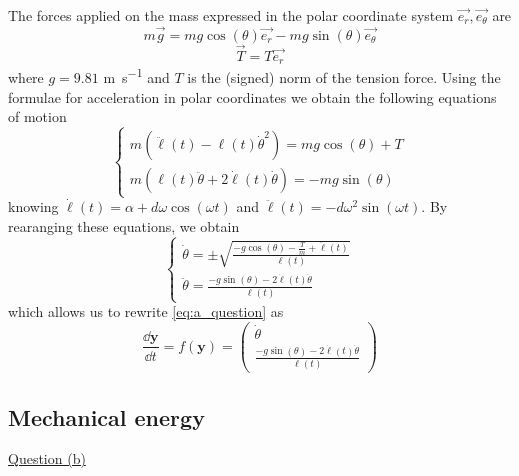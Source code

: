 The forces applied on the mass expressed in the polar coordinate system \(\vec{e_r}, \vec{e_\theta}\) are
\begin{equation}
    m\vec{g} = mg \cos(\theta) \vec{e_r} - mg \sin(\theta) \vec{e_\theta}
\end{equation}
\begin{equation}
    \vec{T} = T \vec{e_r}
\end{equation}
where \(g=9.81\) \si{\meter\per\second} and \(T\) is the (signed) norm of the tension force. Using the formulae for acceleration in polar coordinates we obtain the following equations of motion
\begin{equation}
    \begin{cases}
        m(\ddot\ell(t) - \ell(t) \dot\theta^2) = mg\cos(\theta) + T \\
        m(\ell(t)\ddot\theta + 2\dot\ell(t) \dot\theta) = -mg\sin(\theta)
    \end{cases}
    \label{eq:motion}
\end{equation}
knowing $\dot\ell(t) = \alpha + d\omega\cos(\omega t)$ and $\ddot\ell(t) = -d\omega^2\sin(\omega t)$. By rearanging these equations, we obtain
\begin{equation}
    \begin{cases}
        \dot\theta = \pm \sqrt{\frac{-g\cos(\theta) - \frac{T}{m} + \ddot\ell(t)}{\ell(t)}} \\
        \ddot\theta = \frac{-g\sin(\theta) - 2\dot\ell(t) \dot\theta}{\ell(t)}
    \end{cases}
    \label{eq:thetadot_thetadotdot}
\end{equation}
which allows us to rewrite \autoref{eq:a_question} as
\begin{equation}
    \frac{\dd \textbf{y}}{\dd t} = f(\textbf{y}) = \left(\begin{matrix}
        \dot\theta \\
        \frac{-g\sin(\theta) - 2\dot\ell(t) \dot\theta}{\ell(t)}
    \end{matrix}\right)
    \label{eq:ode}
\end{equation}

\subsection{Mechanical energy}
\underline{Question (b)}

